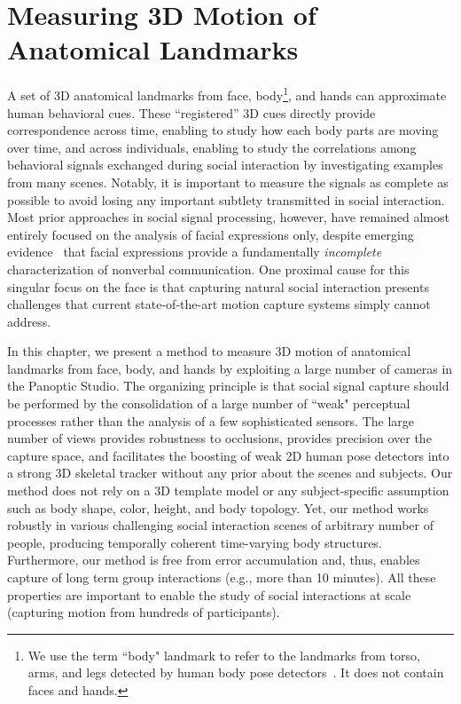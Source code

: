 
\chapter{Measuring 3D Motion of Anatomical Landmarks}
\label{chapter:mocap}

A set of 3D anatomical landmarks from face, body\footnote{We use the term ``body" landmark to refer to the landmarks from torso, arms, and legs detected by human body pose detectors~\cite{Belagiannis2014, Wei2016}. It does not contain faces and hands.}, and hands can approximate human behavioral cues. These ``registered'' 3D cues directly provide correspondence across time, enabling to study how each body parts are moving over time, and across individuals, enabling to study the correlations among behavioral signals exchanged during social interaction by investigating examples from many scenes. Notably, it is important to measure the signals as complete as possible to avoid losing any important subtlety transmitted in social interaction. Most prior approaches in social signal processing, however, have remained almost entirely focused on the analysis of facial expressions only, despite emerging evidence~\cite{Meeren-2005,Aviezer-2012} that facial expressions provide a fundamentally \emph{incomplete} characterization of nonverbal communication. One proximal cause for this singular focus on the face is that capturing natural social interaction presents challenges that current state-of-the-art motion capture systems simply cannot address. 

In this chapter, we present a method to measure 3D motion of anatomical landmarks from face, body, and hands by exploiting a large number of cameras in the Panoptic Studio. The organizing principle is that social signal capture should be performed by the consolidation of a large number of ``weak" perceptual processes rather than the analysis of a few sophisticated sensors. The large number of views provides robustness to occlusions, provides precision over the capture space, and facilitates the boosting of weak 2D human pose detectors into a strong 3D skeletal tracker without any prior about the scenes and subjects. Our method does not rely on a 3D template model or any subject-specific assumption such as body shape, color, height, and body topology. Yet, our method works robustly in various challenging social interaction scenes of arbitrary number of people, producing temporally coherent time-varying body structures. Furthermore, our method is free from error accumulation and, thus, enables capture of long term group interactions (e.g., more than 10 minutes). All these properties are important to enable the study of social interactions at scale (capturing motion from hundreds of participants). 

